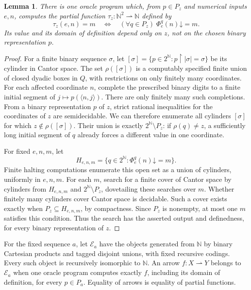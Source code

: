 \documentclass[11pt]{article}
\newtheorem{lemma}[theorem]{Lemma}
\newcommand{\N}{\mathbb N}
\begin{document}
\begin{lemma}\label{lem:miller-unanimity}
There is one oracle program which, from $p\in P_z$ and numerical inputs
$e,n$, computes the partial function $\tau_z:\N^2\rightharpoonup\N$
defined by
\[
 \tau_z(e,n)=m
 \quad\Longleftrightarrow\quad
 (\forall q\in P_z)\;\Phi_e^q(n)\mathord\downarrow=m.
\]
Its value and its domain of definition depend only on $z$, not on the
chosen binary representation $p$.
\end{lemma}
\begin{proof}
For a finite binary sequence $\sigma$, let
$[\sigma]=\{p\in2^{\N}:p\mathbin{\upharpoonright}|\sigma|=\sigma\}$
be its cylinder in Cantor space.
The set $\rho([\sigma])$ is a computably specified finite
union of closed dyadic boxes in $Q$, with restrictions on only finitely
many coordinates. For each affected coordinate $n$, complete the
prescribed binary digits to a finite initial segment of
$j\mapsto p(\langle n,j\rangle)$. There are only finitely many such
completions.
From a binary representation $p$ of $z$, strict rational inequalities for the coordinates
of $z$ are semidecidable. We can therefore enumerate all cylinders
$[\sigma]$ for which $z\notin\rho([\sigma])$. Their union is exactly
$2^{\N}\setminus P_z$: if $\rho(q)\ne z$, a sufficiently long initial
segment of $q$ already forces a different value in one coordinate.

For fixed $e,n,m$, let
\[
 H_{e,n,m}=\{q\in2^{\N}:\Phi_e^q(n)\mathord\downarrow=m\}.
\]
Finite halting computations enumerate this open set as a union of
cylinders, uniformly in $e,n,m$. For each $m$, search for a finite cover
of Cantor space by cylinders from $H_{e,n,m}$ and
$2^{\N}\setminus P_z$, dovetailing these searches over $m$. Whether finitely
many cylinders cover Cantor space is decidable. Such a cover exists
exactly when $P_z\subseteq H_{e,n,m}$, by compactness. Since $P_z$ is
nonempty, at most one $m$ satisfies this condition. Thus the search has
the asserted output and definedness, for every binary representation of $z$.
\end{proof}

For the fixed sequence $a$, let $\mathcal E_a$ have the
objects generated from $\N$ by binary Cartesian products and tagged
disjoint unions, with fixed recursive codings. Every such object is
recursively isomorphic to $\N$. An arrow $f:X\rightharpoonup Y$ belongs
to $\mathcal E_a$ when one oracle program computes exactly $f$, including
its domain of definition, for every $p\in P_a$. Equality of arrows is
equality of partial functions.
\end{document}
